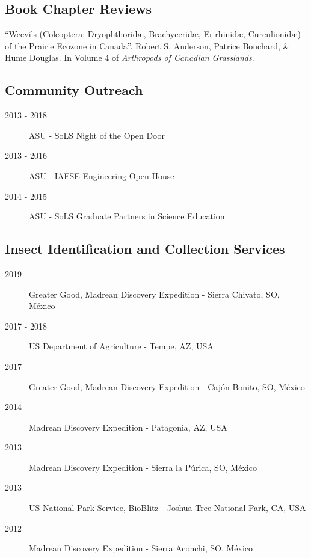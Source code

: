 \documentclass[12pt,a4paper]{article}
\begin{document}
	\subsection*{Book Chapter Reviews}
		\begin{description}
			\item ``Weevils (Coleoptera: Dryophthorid\ae, Brachycerid\ae, Erirhinid\ae, Curculionid\ae) of the Prairie Ecozone in Canada''.
					Robert S. Anderson, Patrice Bouchard, \& Hume Douglas.
					In Volume 4 of \textit{Arthropods of Canadian Grasslands}.
		\end{description}

	\subsection*{Community Outreach}
		\begin{description}
			\item [2013 - 2018] ASU - SoLS Night of the Open Door
			\item [2013 - 2016] ASU - IAFSE Engineering Open House
			\item [2014 - 2015] ASU - SoLS Graduate Partners in Science Education
		\end{description}
		
	\subsection*{Insect Identification and Collection Services}
		\begin{description}
			\item [2019] Greater Good, Madrean Discovery Expedition - Sierra Chivato, SO, M\'{e}xico
			\item [2017 - 2018] US Department of Agriculture - Tempe, AZ, USA
			\item [2017] Greater Good, Madrean Discovery Expedition - Caj\'{o}n Bonito, SO, M\'{e}xico
			\item [2014] Madrean Discovery Expedition - Patagonia, AZ, USA
			\item [2013] Madrean Discovery Expedition - Sierra la P\'{u}rica, SO, M\'{e}xico
			\item [2013] US National Park Service, BioBlitz - Joshua Tree National Park, CA, USA
			\item [2012] Madrean Discovery Expedition - Sierra Aconchi, SO, M\'{e}xico
		\end{description}
\end{document}
